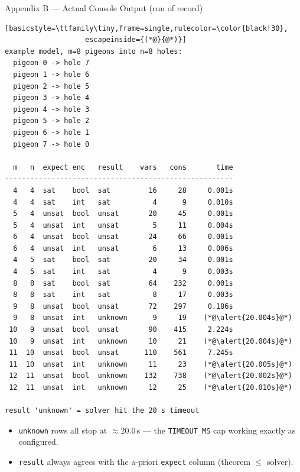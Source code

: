 \documentclass[10pt,aspectratio=169,xcolor={table}]{beamer}
\begin{document}
\begin{frame}[fragile]{Appendix B --- Actual Console Output (run of record)}
\begin{lstlisting}[basicstyle=\ttfamily\tiny,frame=single,rulecolor=\color{black!30},
                   escapeinside={(*@}{@*)}]
example model, m=8 pigeons into n=8 holes:
  pigeon 0 -> hole 7
  pigeon 1 -> hole 6
  pigeon 2 -> hole 5
  pigeon 3 -> hole 4
  pigeon 4 -> hole 3
  pigeon 5 -> hole 2
  pigeon 6 -> hole 1
  pigeon 7 -> hole 0

  m   n  expect enc   result    vars   cons       time
------------------------------------------------------
  4   4  sat    bool  sat         16     28     0.001s
  4   4  sat    int   sat          4      9     0.010s
  5   4  unsat  bool  unsat       20     45     0.001s
  5   4  unsat  int   unsat        5     11     0.004s
  6   4  unsat  bool  unsat       24     66     0.001s
  6   4  unsat  int   unsat        6     13     0.006s
  4   5  sat    bool  sat         20     34     0.001s
  4   5  sat    int   sat          4      9     0.003s
  8   8  sat    bool  sat         64    232     0.001s
  8   8  sat    int   sat          8     17     0.003s
  9   8  unsat  bool  unsat       72    297     0.186s
  9   8  unsat  int   unknown      9     19    (*@\alert{20.004s}@*)
 10   9  unsat  bool  unsat       90    415     2.224s
 10   9  unsat  int   unknown     10     21    (*@\alert{20.004s}@*)
 11  10  unsat  bool  unsat      110    561     7.245s
 11  10  unsat  int   unknown     11     23    (*@\alert{20.005s}@*)
 12  11  unsat  bool  unknown    132    738    (*@\alert{20.002s}@*)
 12  11  unsat  int   unknown     12     25    (*@\alert{20.010s}@*)

result 'unknown' = solver hit the 20 s timeout
\end{lstlisting}
  \begin{itemize}\itemsep1pt
    \item \texttt{unknown} rows all stop at $\approx$20.0\,s --- the
          \texttt{TIMEOUT\_MS} cap working exactly as configured.
    \item \texttt{result} always agrees with the a-priori
          \texttt{expect} column (theorem $\le$ solver).
  \end{itemize}
\end{frame}
\end{document}
